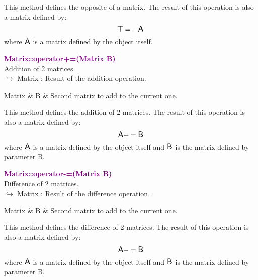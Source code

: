 This method defines the opposite of a matrix.
The result of this operation is also a matrix defined by:
\begin{equation*}
\mbox{\large\ensuremath{\mathsf{T}}} = - \mbox{\large\ensuremath{\mathsf{A}}}
\end{equation*}
where $\mbox{\large\ensuremath{\mathsf{A}}}$ is a matrix defined by the object itself.

\textcolor{purple}{\textbf{Matrix::operator+=(Matrix B)}}\label{Matrix::operator+=(Matrix B)}\\
Addition of 2 matrices.\\ \hspace*{10mm}$\hookrightarrow$ Matrix : Result of the addition operation.

\begin{tcolorbox}[width=\textwidth,myArgs,tabularx={ll|R}]
Matrix & B & Second matrix to add to the current one.
\end{tcolorbox}

This method defines the addition of 2 matrices.
The result of this operation is also a matrix defined by:
\begin{equation*}
\mbox{\large\ensuremath{\mathsf{A}}} += \mbox{\large\ensuremath{\mathsf{B}}}
\end{equation*}
where $\mbox{\large\ensuremath{\mathsf{A}}}$ is a matrix defined by the object itself and $\mbox{\large\ensuremath{\mathsf{B}}}$ is the matrix defined by parameter B.

\textcolor{purple}{\textbf{Matrix::operator-=(Matrix B)}}\label{Matrix::operator-=(Matrix B)}\\
Difference of 2 matrices.\\ \hspace*{10mm}$\hookrightarrow$ Matrix : Result of the difference operation.

\begin{tcolorbox}[width=\textwidth,myArgs,tabularx={ll|R}]
Matrix & B & Second matrix to add to the current one.
\end{tcolorbox}

This method defines the difference of 2 matrices.
The result of this operation is also a matrix defined by:
\begin{equation*}
\mbox{\large\ensuremath{\mathsf{A}}} -= \mbox{\large\ensuremath{\mathsf{B}}}
\end{equation*}
where $\mbox{\large\ensuremath{\mathsf{A}}}$ is a matrix defined by the object itself and $\mbox{\large\ensuremath{\mathsf{B}}}$ is the matrix defined by parameter B.

